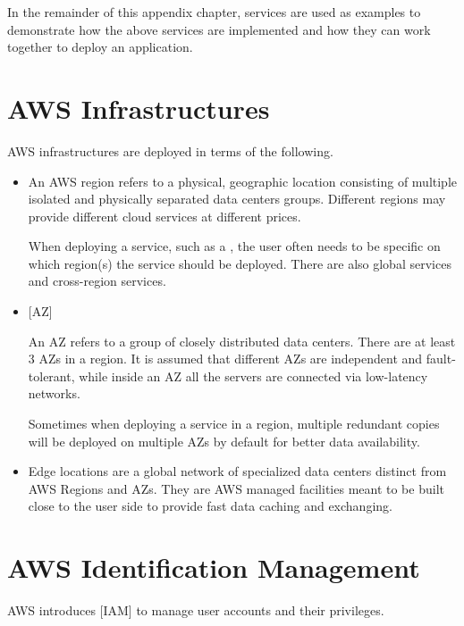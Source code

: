 In the remainder of this appendix chapter,  services are used as examples to demonstrate how the above services are implemented and how they can work together to deploy an application.

\section{AWS Infrastructures}

AWS infrastructures are deployed in terms of the following.
\begin{itemize}
	\item {}
	
	An AWS region refers to a physical, geographic location consisting of multiple isolated and physically separated data centers groups. Different regions may provide different cloud services at different prices. 
	
	When deploying a service, such as a , the user often needs to be specific on which region(s) the service should be deployed. There are also global services and cross-region services.
	
	\item {}[AZ]
	
	An AZ refers to a group of closely distributed data centers. There are at least 3 AZs in a region. It is assumed that different AZs are independent and fault-tolerant, while inside an AZ all the servers are connected via low-latency networks. 
	
	Sometimes when deploying a service in a region, multiple redundant copies will be deployed on multiple AZs by default for better data availability.
	
	\item {}
	
	Edge locations are a global network of specialized data centers distinct from AWS Regions and AZs. They are AWS managed facilities meant to be built close to the user side to provide fast data caching and exchanging.   
	
\end{itemize}

\section{AWS Identification Management}

AWS introduces [IAM] to manage user accounts and their privileges. 

